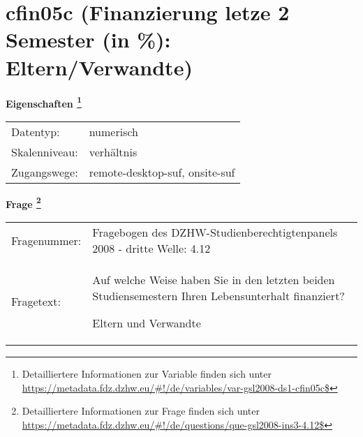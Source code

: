 
    \setcounter{footnote}{0}

    \vspace*{-1.8cm}
	\section{cfin05c (Finanzierung letze 2 Semester (in \%): Eltern/Verwandte)}
	\label{section:cfin05c}



    \vspace*{0.5cm}
    \noindent\textbf{Eigenschaften
	\footnote{Detailliertere Informationen zur Variable finden sich unter
		\url{https://metadata.fdz.dzhw.eu/\#!/de/variables/var-gsl2008-ds1-cfin05c$}}}\\
	\begin{tabularx}{\hsize}{@{}lX}
	Datentyp: & numerisch \\
	Skalenniveau: & verhältnis \\
	Zugangswege: &
	  remote-desktop-suf, 
	  onsite-suf
 \\
    \end{tabularx}



				\vspace*{0.5cm}
                \noindent\textbf{Frage
	                \footnote{Detailliertere Informationen zur Frage finden sich unter
		              \url{https://metadata.fdz.dzhw.eu/\#!/de/questions/que-gsl2008-ins3-4.12$}}}\\
				\begin{tabularx}{\hsize}{@{}lX}
					Fragenummer: &
					  Fragebogen des DZHW-Studienberechtigtenpanels 2008 - dritte Welle:
					  4.12
 \\
					Fragetext: & Auf welche Weise haben Sie in den letzten beiden Studiensemestern Ihren Lebensunterhalt finanziert?\par  Eltern und Verwandte \\
				\end{tabularx}





